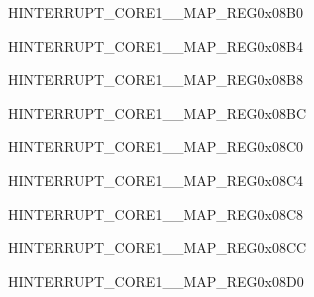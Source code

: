 \begin{register}{H}{INTERRUPT\_CORE1\_\_MAP\_REG}{0x08B0}\label{regdesc:INTERRUPTCORE1SPI2DMAINTMAPREG}
\end{register}
\vspace{-3em}

\begin{register}{H}{INTERRUPT\_CORE1\_\_MAP\_REG}{0x08B4}\label{regdesc:INTERRUPTCORE1SPI3DMAINTMAPREG}
\end{register}
\vspace{-3em}

\begin{register}{H}{INTERRUPT\_CORE1\_\_MAP\_REG}{0x08B8}\label{regdesc:INTERRUPTCORE1SPI4DMAINTMAPREG}
\end{register}
\vspace{-3em}

\begin{register}{H}{INTERRUPT\_CORE1\_\_MAP\_REG}{0x08BC}\label{regdesc:INTERRUPTCORE1WDGINTMAPREG}
\end{register}
\vspace{-3em}

\begin{register}{H}{INTERRUPT\_CORE1\_\_MAP\_REG}{0x08C0}\label{regdesc:INTERRUPTCORE1TIMERINT1MAPREG}
\end{register}
\vspace{-3em}

\begin{register}{H}{INTERRUPT\_CORE1\_\_MAP\_REG}{0x08C4}\label{regdesc:INTERRUPTCORE1TIMERINT2MAPREG}
\end{register}
\vspace{-3em}

\begin{register}{H}{INTERRUPT\_CORE1\_\_MAP\_REG}{0x08C8}\label{regdesc:INTERRUPTCORE1TGT0INTMAPREG}
\end{register}
\vspace{-3em}

\begin{register}{H}{INTERRUPT\_CORE1\_\_MAP\_REG}{0x08CC}\label{regdesc:INTERRUPTCORE1TGT1INTMAPREG}
\end{register}
\vspace{-3em}

\begin{register}{H}{INTERRUPT\_CORE1\_\_MAP\_REG}{0x08D0}\label{regdesc:INTERRUPTCORE1TGWDTINTMAPREG}
\end{register}
\vspace{-3em}

